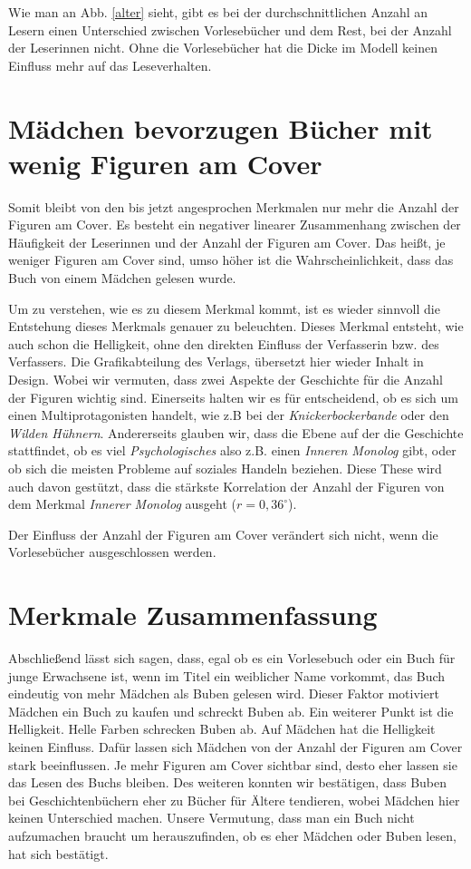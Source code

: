 Wie man an Abb. \ref{alter} sieht, gibt es bei der durchschnittlichen
Anzahl an Lesern einen Unterschied zwischen Vorlesebücher und dem Rest,
bei der Anzahl der Leserinnen nicht. Ohne die Vorlesebücher hat die
Dicke im Modell keinen Einfluss mehr auf das Leseverhalten.

\section{Mädchen bevorzugen Bücher mit wenig Figuren am Cover}

Somit bleibt von den bis jetzt angesprochen Merkmalen nur mehr die
Anzahl der Figuren am Cover. Es besteht ein negativer linearer
Zusammenhang zwischen der Häufigkeit der Leserinnen und der Anzahl der
Figuren am Cover. Das heißt, je weniger Figuren am Cover sind, umso
höher ist die Wahrscheinlichkeit, dass das Buch von einem Mädchen
gelesen wurde.

Um zu verstehen, wie es zu diesem Merkmal kommt, ist es wieder sinnvoll
die Entstehung dieses Merkmals genauer zu beleuchten. Dieses Merkmal
entsteht, wie auch schon die Helligkeit, ohne den direkten Einfluss der
Verfasserin bzw. des Verfassers. Die Grafikabteilung des Verlags,
übersetzt hier wieder Inhalt in Design. Wobei wir vermuten, dass zwei
Aspekte der Geschichte für die Anzahl der Figuren wichtig sind.
Einerseits halten wir es für entscheidend, ob es sich um einen
Multiprotagonisten handelt, wie z.B bei der \emph{Knickerbockerbande}
oder den \emph{Wilden Hühnern}. Andererseits glauben wir, dass die Ebene
auf der die Geschichte stattfindet, ob es viel \emph{Psychologisches}
also z.B. einen \emph{Inneren Monolog} gibt, oder ob sich die meisten
Probleme auf soziales Handeln beziehen. Diese These wird auch davon
gestützt, dass die stärkste Korrelation der Anzahl der Figuren von dem
Merkmal \emph{Innerer Monolog} ausgeht ($r=0{,}36^\circ$).

Der Einfluss der Anzahl der Figuren am Cover verändert sich nicht, wenn
die Vorlesebücher ausgeschlossen werden.

\section{Merkmale Zusammenfassung}

Abschließend lässt sich sagen, dass, egal ob es ein Vorlesebuch oder ein
Buch für junge Erwachsene ist, wenn im Titel ein weiblicher Name
vorkommt, das Buch eindeutig von mehr Mädchen als Buben gelesen wird.
Dieser Faktor motiviert Mädchen ein Buch zu kaufen und schreckt Buben
ab. Ein weiterer Punkt ist die Helligkeit. Helle Farben schrecken Buben
ab. Auf Mädchen hat die Helligkeit keinen Einfluss. Dafür lassen sich
Mädchen von der Anzahl der Figuren am Cover stark beeinflussen. Je mehr
Figuren am Cover sichtbar sind, desto eher lassen sie das Lesen des
Buchs bleiben. Des weiteren konnten wir bestätigen, dass Buben bei
Geschichtenbüchern eher zu Bücher für Ältere tendieren, wobei Mädchen
hier keinen Unterschied machen. Unsere Vermutung, dass man ein Buch
nicht aufzumachen braucht um herauszufinden, ob es eher Mädchen oder
Buben lesen, hat sich bestätigt.

